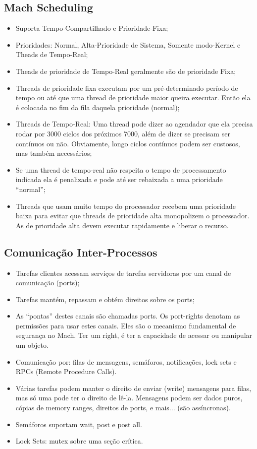 \documentclass[12pt]{article}
\begin{document}
\subsection{Mach Scheduling}
\begin{itemize}
    \item Suporta Tempo-Compartilhado e Prioridade-Fixa;
    \item Prioridades: Normal, Alta-Prioridade de Sistema, Somente modo-Kernel e Theads de Tempo-Real;
    \item Theads de prioridade de Tempo-Real geralmente são de prioridade Fixa;
    \item Threads de prioridade fixa executam por um pré-determinado período de tempo ou até que uma thread de prioridade maior queira executar. Então ela é colocada no fim da fila daquela prioridade (normal);
    \item Threads de Tempo-Real: Uma thread pode dizer ao agendador que ela precisa rodar por 3000 ciclos dos próximos 7000, além de dizer se precisam ser contínuos ou não. Obviamente, longo ciclos contínuos podem ser custosos, mas também necessários;
    \item Se uma thread de tempo-real não respeita o tempo de processamento indicada ela é penalizada e pode até ser rebaixada a uma prioridade “normal”;
    \item Threads que usam muito tempo do processador recebem uma prioridade baixa para evitar que threads de prioridade alta monopolizem o processador. As de prioridade alta devem executar rapidamente e liberar o recurso.
\end{itemize}
\subsection{Comunicação Inter-Processos}
\begin{itemize}
    \item Tarefas clientes acessam serviços de tarefas servidoras por um canal de comunicação (ports);
    \item Tarefas mantém, repassam e obtém direitos sobre os ports;
    \item As “pontas” destes canais são chamadas ports. Os port-rights denotam as permissões para usar estes canais. Eles são o mecanismo fundamental de segurança no Mach. Ter um right, é ter a capacidade de acessar ou manipular um objeto.
    \item Comunicação por: filas de mensagens, semáforos, notificações, lock sets e RPCs (Remote Procedure Calls).
    \item Várias tarefas podem manter o direito de enviar (write) mensagens para filas, mas só uma pode ter o direito de lê-la. Mensagens podem ser dados puros, cópias de memory ranges, direitos de ports, e mais... (são assíncronas).
    \item Semáforos suportam wait, post e post all.
    \item Lock Sets: mutex sobre uma seção crítica.
\end{itemize}
\end{document}
